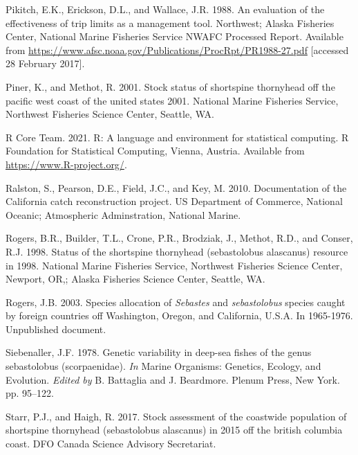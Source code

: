 \documentclass[11pt,
  english,
  letterpaper,
]{article}
\newlength{\cslhangindent}
\newenvironment{CSLReferences}[2] %
 {%
  \setlength{\parindent}{0pt}
  \ifodd #1 \everypar{\setlength{\hangindent}{\cslhangindent}}\ignorespaces\fi
  \ifnum #2 > 0
  \setlength{\parskip}{#2\baselineskip}
  \fi
 }%
 {}
\begin{document}
\begin{CSLReferences}{1}{0}
\leavevmode{}%
Pikitch, E.K., Erickson, D.L., and Wallace, J.R. 1988. An evaluation of the effectiveness of trip limits as a management tool. Northwest; Alaska Fisheries Center, National Marine Fisheries Service NWAFC Processed Report. Available from \url{https://www.afsc.noaa.gov/Publications/ProcRpt/PR1988-27.pdf} {[}accessed 28 February 2017{]}.

\leavevmode{}%
Piner, K., and Methot, R. 2001. Stock status of shortspine thornyhead off the pacific west coast of the united states 2001. National Marine Fisheries Service, Northwest Fisheries Science Center, Seattle, {WA}.

\leavevmode{}%
R Core Team. 2021. R: A language and environment for statistical computing. R Foundation for Statistical Computing, Vienna, Austria. Available from \url{https://www.R-project.org/}.

\leavevmode{}%
Ralston, S., Pearson, D.E., Field, J.C., and Key, M. 2010. Documentation of the {California} catch reconstruction project. US Department of Commerce, National Oceanic; Atmospheric Adminstration, National Marine.

\leavevmode{}%
Rogers, B.R., Builder, T.L., Crone, P.R., Brodziak, J., Methot, R.D., and Conser, R.J. 1998. Status of the shortspine thornyhead (sebastolobus alascanus) resource in 1998. National Marine Fisheries Service, Northwest Fisheries Science Center, Newport, {OR},; Alaska Fisheries Science Center, Seattle, {WA}.

\leavevmode{}%
Rogers, J.B. 2003. Species allocation of \emph{{Sebastes}} and \emph{sebastolobus} species caught by foreign countries off {Washington}, {Oregon}, and {California}, {U}.{S}.{A}. In 1965-1976. Unpublished document.

\leavevmode{}%
Siebenaller, J.F. 1978. Genetic variability in deep-sea fishes of the genus sebastolobus (scorpaenidae). \emph{In} Marine Organisms: Genetics, Ecology, and Evolution. \emph{Edited by} B. Battaglia and J. Beardmore. Plenum Press, New York. pp. 95--122.

\leavevmode{}%
Starr, P.J., and Haigh, R. 2017. Stock assessment of the coastwide population of shortspine thornyhead (sebastolobus alascanus) in 2015 off the british columbia coast. DFO Canada Science Advisory Secretariat.


\end{CSLReferences}
\end{document}
